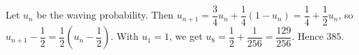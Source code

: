 Let $u_n$ be the waving probability. Then $u_{n+1}=\dfrac{3}{4}u_n+\dfrac{1}{4}(1-u_n)=\dfrac{1}{4}+\dfrac{1}{2}u_n$, so $u_{n+1}-\dfrac{1}{2}=\dfrac{1}{2}(u_n-\dfrac{1}{2})$. With $u_1=1$, we get $u_8=\dfrac{1}{2}+\dfrac{1}{256}=\dfrac{129}{256}$. Hence $\boxed{385}$.
